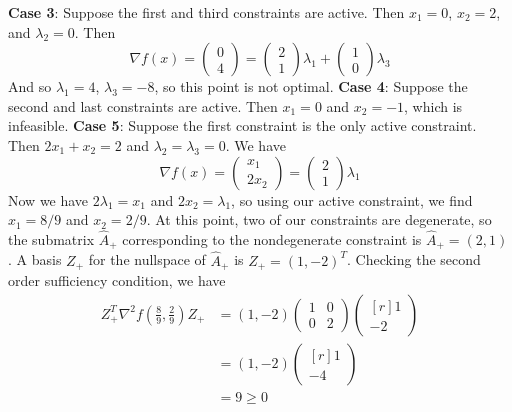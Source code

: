 \documentclass{article}
\begin{document}
\newline\newline
\textbf{Case 3}: Suppose the first and third constraints are active. Then $x_1 = 0$, $x_2 = 2$, and $\lambda_2 = 0$. Then
\[\nabla f(x) = \begin{pmatrix}
    0\\
    4
\end{pmatrix} = 
\begin{pmatrix}
    2\\
    1
\end{pmatrix}\lambda_1 + 
\begin{pmatrix}
    1\\
    0
\end{pmatrix}\lambda_3\]
And so $\lambda_1 = 4$, $\lambda_3 = -8$, so this point is not optimal.
\newline\newline
\textbf{Case 4}: Suppose the second and last constraints are active. Then $x_1 = 0$ and $x_2 = -1$, which is infeasible.
\newline\newline
\textbf{Case 5}: Suppose the first constraint is the only active constraint. Then $2x_1 + x_2 = 2$ and $\lambda_2 = \lambda_3 = 0$. We have
\[\nabla f(x) = \begin{pmatrix}
    x_1\\
    2x_2
\end{pmatrix} = \begin{pmatrix}
    2\\
    1
\end{pmatrix}\lambda_1\]
Now we have $2\lambda_1 = x_1$ and $2x_2 = \lambda_1$, so using our active constraint, we find $x_1 = 8/9$ and $x_2 = 2/9$. At this point, two of our constraints are degenerate, so the submatrix $\hat{A}_+$ corresponding to the nondegenerate constraint is $\hat{A}_+ = (2,1)$. A basis $Z_+$ for the nullspace of $\hat{A}_+$ is $Z_+ = (1, -2)^T$. Checking the second order sufficiency condition, we have
\begin{align*}
    Z_+^T\nabla^2f(\tfrac{8}{9},\tfrac{2}{9})Z_+ &= (1,-2)\begin{pmatrix}
        1 & 0\\
        0 & 2
    \end{pmatrix}\begin{pmatrix*}[r]
        1\\
        -2
    \end{pmatrix*}\\
    &= (1,-2)\begin{pmatrix*}[r]
        1\\
        -4
    \end{pmatrix*}\\
    &= 9 \geq 0
\end{align*}
\end{document}

